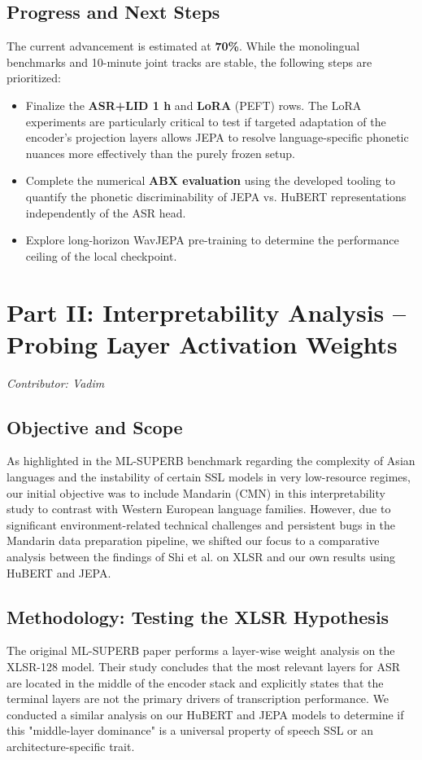 \documentclass[11pt]{article}
\begin{document}
\subsection*{Progress and Next Steps}
The current advancement is estimated at \textbf{70\%}. While the monolingual benchmarks and 10-minute joint tracks are stable, the following steps are prioritized:
\begin{itemize}
    \item Finalize the \textbf{ASR+LID 1 h} and \textbf{LoRA} (PEFT) rows. The LoRA experiments are particularly critical to test if targeted adaptation of the encoder's projection layers allows JEPA to resolve language-specific phonetic nuances more effectively than the purely frozen setup.
    \item Complete the numerical \textbf{ABX evaluation} using the developed tooling to quantify the phonetic discriminability of JEPA vs. HuBERT representations independently of the ASR head.
    \item Explore long-horizon WavJEPA pre-training to determine the performance ceiling of the local checkpoint.
\end{itemize}

\newpage
\section*{Part II: Interpretability Analysis -- Probing Layer Activation Weights}
\textit{Contributor: Vadim}

\subsection{Objective and Scope}
As highlighted in the ML-SUPERB benchmark regarding the complexity of Asian languages and the instability of certain SSL models in very low-resource regimes, our initial objective was to include Mandarin (CMN) in this interpretability study to contrast with Western European language families. However, due to significant environment-related technical challenges and persistent bugs in the Mandarin data preparation pipeline, we shifted our focus to a comparative analysis between the findings of Shi et al.  on XLSR and our own results using HuBERT and JEPA.

\subsection{Methodology: Testing the XLSR Hypothesis}
The original ML-SUPERB paper performs a layer-wise weight analysis on the XLSR-128 model. Their study concludes that the most relevant layers for ASR are located in the middle of the encoder stack and explicitly states that the terminal layers are not the primary drivers of transcription performance. We conducted a similar analysis on our HuBERT and JEPA models to determine if this "middle-layer dominance" is a universal property of speech SSL or an architecture-specific trait.
\end{document}
